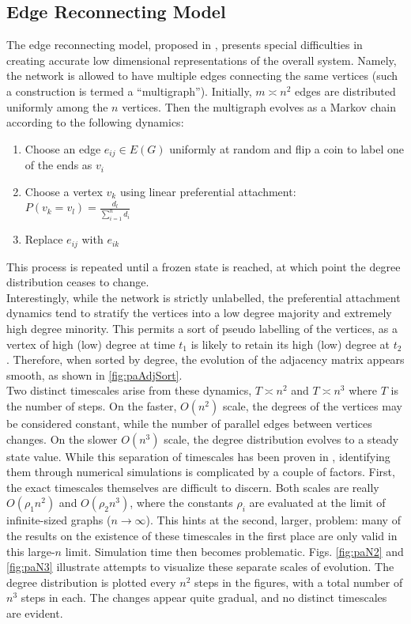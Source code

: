 \documentclass[11pt]{article}
\begin{document}
\subsection{Edge Reconnecting Model}
\indent The edge reconnecting model, proposed in \cite{balazs'paper}, presents special difficulties in creating accurate low dimensional representations of the overall system. Namely, the network is allowed to have multiple edges connecting the same vertices (such a construction is termed a ``multigraph''). Initially, $m\asymp n^{2}$ edges are distributed uniformly among the $n$ vertices. Then the multigraph evolves as a Markov chain according to the following dynamics:
\begin{enumerate}
\item Choose an edge $e_{ij} \in E(G)$ uniformly at random and flip a coin to label one of the ends as $v_{i}$
\item Choose a vertex $v_{k}$ using linear preferential attachment: $P(v_{k} = v_{l}) = \frac{d_{l}}{\sum\limits_{i=1}^{n} d_{i}}$
\item Replace $e_{ij}$ with $e_{ik}$
\end{enumerate}
This process is repeated until a frozen state is reached, at which point the degree distribution ceases to change.\vspace{1mm}\\
\indent Interestingly, while the network is strictly unlabelled, the preferential attachment dynamics tend to stratify the vertices into a low degree majority and extremely high degree minority. This permits a sort of pseudo labelling of the vertices, as a vertex of high (low) degree at time $t_{1}$ is likely to retain its high (low) degree at $t_{2}$. Therefore, when sorted by degree, the evolution of the adjacency matrix appears smooth, as shown in \ref{fig:paAdjSort}. \vspace{1mm}\\
\indent Two distinct timescales arise from these dynamics, $T\asymp n^{2}$ and $T\asymp n^{3}$ where $T$ is the number of steps. On the faster, $O(n^{2})$ scale, the degrees of the vertices may be considered constant, while the number of parallel edges between vertices changes. On the slower $O(n^{3})$ scale, the degree distribution evolves to a steady state value. While this separation of timescales has been proven in \cite{balazs:rsa12}, identifying them through numerical simulations is complicated by a couple of factors. First, the exact timescales themselves are difficult to discern. Both scales are really $O(\rho_{1} n^{2})$ and $O(\rho_{2} n^{3})$, where the constants $\rho_{i}$ are evaluated at the limit of infinite-sized graphs ($n\rightarrow \infty$). This hints at the second, larger, problem: many of the results on the existence of these timescales in the first place are only valid in this large-$n$ limit. Simulation time then becomes problematic. Figs. \ref{fig:paN2} and \ref{fig:paN3} illustrate attempts to visualize these separate scales of evolution. The degree distribution is plotted every $n^{2}$ steps in the figures, with a total number of $n^{3}$ steps in each. The changes appear quite gradual, and no distinct timescales are evident.\\
\end{document}

